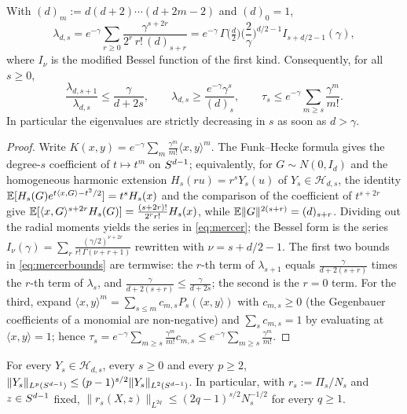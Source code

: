 \begin{lemma}\label{lem:mercer}
With $(d)_{m}:=d(d+2)\cdots(d+2m-2)$ and $(d)_0=1$,
\begin{equation}
\lambda_{d,s}=e^{-\gamma}\sum_{r\ge0}\frac{\gamma^{s+2r}}{2^r\,r!\,(d)_{s+r}}
=e^{-\gamma}\,\Gamma\!\big(\tfrac d2\big)\Big(\frac2\gamma\Big)^{d/2-1}I_{s+d/2-1}(\gamma),
\label{eq:mercer}
\end{equation}
where $I_\nu$ is the modified Bessel function of the first kind. Consequently, for all $s\ge0$,
\begin{equation}
\frac{\lambda_{d,s+1}}{\lambda_{d,s}}\le\frac{\gamma}{d+2s},\qquad
\lambda_{d,s}\ge\frac{e^{-\gamma}\gamma^s}{(d)_s},\qquad
\tau_s\le e^{-\gamma}\sum_{m\ge s}\frac{\gamma^m}{m!}.
\label{eq:mercerbounds}
\end{equation}
In particular the eigenvalues are strictly decreasing in $s$ as soon as $d>\gamma$.
\end{lemma}

\begin{proof}
Write $K(x,y)=e^{-\gamma}\sum_m\frac{\gamma^m}{m!}\langle x,y\rangle^m$. The Funk--Hecke formula
\cite{AtkinsonHan} gives the degree-$s$ coefficient of $t\mapsto t^m$ on $S^{d-1}$; equivalently, for
$G\sim N(0,I_d)$ and the homogeneous harmonic extension $H_s(ru)=r^sY_s(u)$ of $Y_s\in\mathcal H_{d,s}$,
the identity $\mathbb{E}[H_s(G)e^{t\langle x,G\rangle-t^2/2}]=t^sH_s(x)$ and the comparison of the coefficient of
$t^{s+2r}$ give $\mathbb{E}[\langle x,G\rangle^{s+2r}H_s(G)]=\frac{(s+2r)!}{2^rr!}H_s(x)$, while
$\mathbb{E}\|G\|^{2(s+r)}=(d)_{s+r}$. Dividing out the radial moments yields the series in \eqref{eq:mercer};
the Bessel form is the series $I_\nu(\gamma)=\sum_r\frac{(\gamma/2)^{\nu+2r}}{r!\,\Gamma(\nu+r+1)}$
\cite[10.25.2]{DLMF} rewritten with $\nu=s+d/2-1$. The first two bounds in \eqref{eq:mercerbounds} are
termwise: the $r$-th term of $\lambda_{s+1}$ equals $\frac{\gamma}{d+2(s+r)}$ times the $r$-th term of
$\lambda_s$, and $\frac{\gamma}{d+2(s+r)}\le\frac{\gamma}{d+2s}$; the second is the $r=0$ term. For the
third, expand $\langle x,y\rangle^m=\sum_{s\le m}c_{m,s}P_s(\langle x,y\rangle)$ with $c_{m,s}\ge0$
(the Gegenbauer coefficients of a monomial are non-negative) and $\sum_sc_{m,s}=1$ by evaluating at
$\langle x,y\rangle=1$; hence $\tau_s=e^{-\gamma}\sum_{m\ge s}\frac{\gamma^m}{m!}c_{m,s}\le
e^{-\gamma}\sum_{m\ge s}\frac{\gamma^m}{m!}$.
\end{proof}

\begin{lemma}\label{lem:hyper}
For every $Y_s\in\mathcal H_{d,s}$, every $s\ge0$ and every $p\ge2$,
$\|Y_s\|_{L^p(S^{d-1})}\le(p-1)^{s/2}\|Y_s\|_{L^2(S^{d-1})}$. In particular, with $r_s:=\Pi_s/N_s$ and $z\in S^{d-1}$
fixed, $\|r_s(X,z)\|_{L^{2q}}\le(2q-1)^{s/2}N_s^{-1/2}$ for every $q\ge1$.
\end{lemma}


